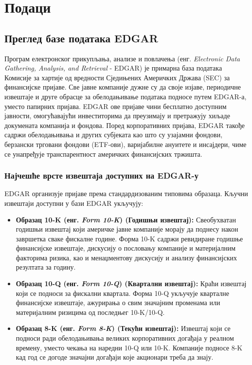 \chapter{Подаци}
\label{sec:3}

\section{Преглед базе података EDGAR}

Програм електронског прикупљања, анализе и повлачења (енг. \textit{Electronic Data Gathering, Analysis, and Retrieval} - EDGAR) је примарна база података Комисије за хартије од вредности Сједињених Америчких Држава (SEC) за финансијске пријаве. Све јавне компаније дужне су да своје изјаве, периодичне извештаје и друге обрасце за обелодањивање података подносе путем EDGAR-а, уместо папирних пријава. EDGAR ове пријаве чини бесплатно доступним јавности, омогућавајући инвеститорима да преузимају и претражују хиљаде докумената компанија и фондова. Поред корпоративних пријава, EDGAR такође садржи обелодањивања и других субјеката као што су узајамни фондови, берзански трговани фондови (ETF-ови), варијабилне ануитете и инсајдери, чиме се унапређује транспарентност америчких финансијских тржишта.

\subsection{Најчешће врсте извештаја доступних на EDGAR-у}

EDGAR организује пријаве према стандардизованим типовима образаца. Кључни извештаји доступни у бази EDGAR укључују:

\begin{itemize}
\item \textbf{Образац 10-K (енг. \textit{Form 10-K}) (Годишњи извештај):} Свеобухватан годишњи извештај који америчке јавне компаније морају да поднесу након завршетка сваке фискалне године. Форма 10-K садржи ревидиране годишње финансијске извештаје, дискусију о пословању компаније и материјалним факторима ризика, као и менаџментову дискусију и анализу финансијских резултата за годину.

\item \textbf{Образац 10-Q (енг. \textit{Form 10-Q}) (Квартални извештај):} Краћи извештај који се подноси за фискални квартала. Форма 10-Q укључује кварталне финансијске извештаје, ажурирања о свим значајним променама или материјалним ризицима од последњег 10-K/10-Q.

\item \textbf{Образац 8-K (енг. \textit{Form 8-K}) (Текући извештај):} Извештај који се подноси ради обелодањивања великих корпоративних догађаја у реалном времену, уместо чекања на наредни 10-Q или 10-K. Компаније подносе 8-K кад год се догоде значајни догађаји које акционари треба да знају.
\end{itemize}

